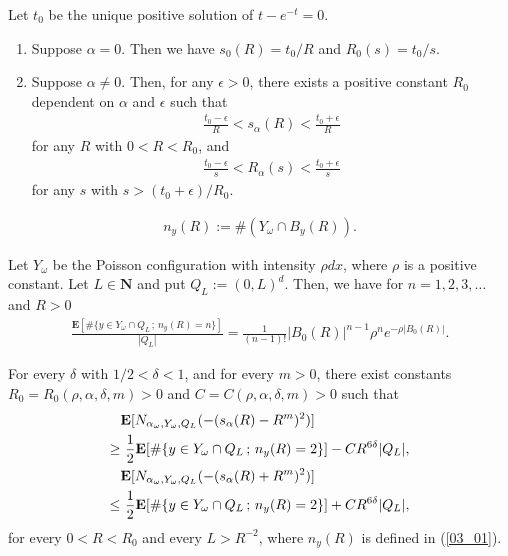 \documentclass[10pt,a4paper]{amsart}
\begin{document}
\begin{proposition}
\label{prop_ev2}
Let 
$t_0$ be the unique positive solution of
$t-e^{-t}=0$. 
\begin{enumerate}
  \item[(1)] Suppose $\alpha=0$.
Then we have
$s_0(R)=t_0/R$
and
$R_0(s)=t_0/s$.



  \item[(2)] Suppose $\alpha\not=0$.
Then, for any $\epsilon>0$,
there exists a positive constant $R_0$ dependent on $\alpha$ and
$\epsilon$
such that
\begin{align}
\label{02_03}
\frac{t_0-\epsilon}{R}<s_\alpha(R)<\frac{{t_0+\epsilon}}{R}
\end{align}
for any $R$ with $0<R<R_0$,
and 
\begin{align}
\label{02_04}
 \frac{t_0-\epsilon}{s}<
R_\alpha(s)<\frac{t_0+\epsilon}{s}
\end{align}
for any $s$ with $s>(t_0+\epsilon)/R_0$.
 \end{enumerate}
\end{proposition}

\begin{align}
\label{03_01}
n_y(R) :=\#(Y_\omega \cap B_y(R)).
\end{align}

\begin{proposition}
\label{prop_cluster}
Let $Y_\omega$ be the Poisson configuration 
with intensity $\rho dx$, where $\rho$ is a positive constant.
Let $L\in\mathbf{N}$ and put $Q_L:=(0,L)^d$.
Then, we have for $n=1,2,3,\ldots$ and $R>0$
\begin{align}
\label{03_02}
 \frac{\mathbf{E}[
\#\{y\in Y_\omega \cap Q_L
\,;\, n_y(R)=n
\}
]}
{|Q_L|}
=
\frac{1}{(n-1)!}|B_0(R)|^{n-1}\rho^n e^{-\rho|B_0(R)|}.
\end{align}
\end{proposition}

\begin{lemma}
\label{lemma_ids-est}
 For every $\delta$ with $1/2<\delta <1$,
and for every $m>0$,
there exist constants $R_0=R_0(\rho,\alpha,\delta,m)>0$
and $C=C(\rho,\alpha,\delta,m)>0$
such that
\begin{align}
& \mathbf{E}[N_{\alpha_\omega,Y_\omega,Q_L}(-(s_\alpha(R)-R^m)^2)]\notag\\
\geq&\  \frac{1}{2}
\mathbf{E}[
\#\{y\in Y_\omega\cap Q_L\,;\, n_y(R)=2\}]
-
C R^{6\delta}|Q_L|,
\label{04_01}
\\
& \mathbf{E}[N_{\alpha_\omega,Y_\omega,Q_L}(-(s_\alpha(R)+R^m)^2)]\notag\\
\leq&\  \frac{1}{2}
\mathbf{E}[
\#\{y\in Y_\omega\cap Q_L\,;\, n_y(R)=2\}]
+
C R^{6\delta}|Q_L|,
\label{04_02}
\end{align}
for every $0<R<R_0$ and every $L>R^{-2}$,
where $n_y(R)$ is defined in (\ref{03_01}).
\end{lemma}
\end{document}
